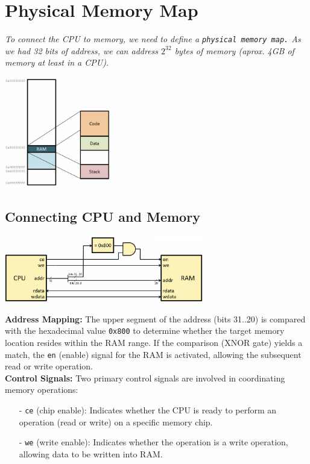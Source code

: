 \section{Physical Memory Map}
\textit{To connect the CPU to memory, we need to define a \texttt{physical memory map.} As we had 32 bits of address, we can address $2^{32}$ bytes of memory (aprox. 4GB of memory at least in a CPU).}
\begin{center}
    \includegraphics[width=0.35\textwidth]{chapters/chapter2b/images/memorymap.png}
\end{center}
\subsection{Connecting CPU and Memory}
\begin{center}
    \includegraphics[width=0.65\textwidth]{chapters/chapter2b/images/cpu_memorymap.png}
\end{center}

\textbf{Address Mapping:} The upper segment of the address (bits 31..20) is compared with the hexadecimal value \texttt{0x800} to determine whether the target memory location resides within the RAM range. If the comparison (XNOR gate) yields a match, the \texttt{en} (enable) signal for the RAM is activated, allowing the subsequent read or write operation. \\
\vspace{5px}
\textbf{Control Signals:} 
Two primary control signals are involved in coordinating memory operations:
\begin{itemize}
    \item[-] \texttt{ce} (chip enable): Indicates whether the CPU is ready to perform an operation (read or write) on a specific memory chip.
    \item[-] \texttt{we} (write enable): Indicates whether the operation is a write operation, allowing data to be written into RAM.
\end{itemize}

